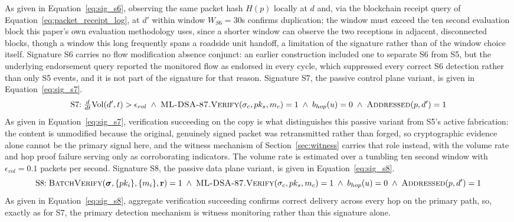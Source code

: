 \documentclass[final,5p,twocolumn]{elsarticle}
\theoremstyle{remark}
\theoremstyle{plain}
\begin{document}
As given in Equation~\eqref{eq:sig_s6}, observing the same packet hash $H(p)$
locally at $d$ and, via the blockchain receipt query of
Equation~\eqref{eq:packet_receipt_log}, at $d'$ within window $W_{S6}{=}30$s
confirms duplication; the window must exceed the ten second evaluation block
this paper's own evaluation methodology uses, since a shorter window can
observe the two receptions in adjacent, disconnected blocks, though a window
this long frequently spans a roadside unit handoff, a limitation of the
signature rather than of the window choice itself. Signature S6 carries no
flow modification absence conjunct: an earlier construction included one to
separate S6 from S5, but the underlying endorsement query reported the
monitored flow as endorsed in every cycle, which suppressed every correct S6
detection rather than only S5 events, and it is not part of the signature
for that reason. Signature S7, the passive control plane variant, is given
in Equation~\eqref{eq:sig_s7}.
\begin{equation}
	\text{S7:}\; \tfrac{d}{dt}\text{Vol}(d',t) > \epsilon_{vol} \;\land\; \textsc{ML-DSA-87.Verify}(\sigma_c, pk_s, m_c) = 1 \;\land\; b_{hop}(u) = 0 \;\land\; \textsc{Addressed}(p, d') = 1
	\label{eq:sig_s7}
\end{equation}
As given in Equation~\eqref{eq:sig_s7}, verification succeeding on the copy
is what distinguishes this passive variant from S5's active fabrication: the
content is unmodified because the original, genuinely signed packet was
retransmitted rather than forged, so cryptographic evidence alone cannot be
the primary signal here, and the witness mechanism of
Section~\ref{sec:witness} carries that role instead, with the volume rate
and hop proof failure serving only as corroborating indicators. The volume
rate is estimated over a tumbling ten second window with
$\epsilon_{vol}{=}0.1$ packets per second. Signature S8, the passive data
plane variant, is given in Equation~\eqref{eq:sig_s8}.
\begin{equation}
	\text{S8:}\; \textsc{BatchVerify}(\boldsymbol{\sigma}, \{pk_i\}, \{m_i\}, \mathbf{r}) = 1 \;\land\; \textsc{ML-DSA-87.Verify}(\sigma_c, pk_s, m_c) = 1 \;\land\; b_{hop}(u) = 0 \;\land\; \textsc{Addressed}(p, d') = 1
	\label{eq:sig_s8}
\end{equation}
As given in Equation~\eqref{eq:sig_s8}, aggregate verification succeeding
confirms correct delivery across every hop on the primary path, so, exactly
as for S7, the primary detection mechanism is witness monitoring rather than
this signature alone.
\end{document}
